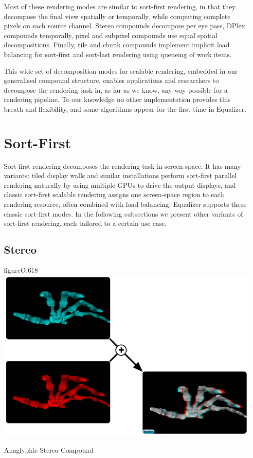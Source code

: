 Most of these rendering modes are similar to sort-first rendering, in that they
decompose the final view spatially or temporally, while computing complete
pixels on each source channel. Stereo compounds decompose per eye pass, DPlex
compounds temporally, pixel and subpixel compounds use equal spatial
decompositions. Finally, tile and chunk compounds implement implicit
load balancing for sort-first and sort-last rendering using queueing of work
items.

This wide set of decomposition modes for scalable rendering, embedded in our
generalised compound structure, enables applications and researchers to
decompose the rendering task in, as far as we know, any way possible for a
rendering pipeline. To our knowledge no other implementation provides this
breath and flexibility, and some algorithms appear for the first time in
Equalizer.

\section{Sort-First}

Sort-first rendering decomposes the rendering task in screen space. It has many
variants: tiled display walls and similar installations perform sort-first
parallel rendering naturally by using multiple GPUs to drive the output
displays, and classic sort-first scalable rendering assigns one screen-space
region to each rendering resource, often combined with load balancing.
Equalizer supports these classic sort-first modes. In the following subsections
we present other variants of sort-first rendering, each tailored to a certain
use case.

\subsection{Stereo}


\begin{wrapfloat}{figure}{O}{.618\textwidth}
 \includegraphics[width=.618\textwidth]{images/Stereo}
 {\caption{\label{fStereo}Anaglyphic Stereo Compound}}
\end{wrapfloat}

